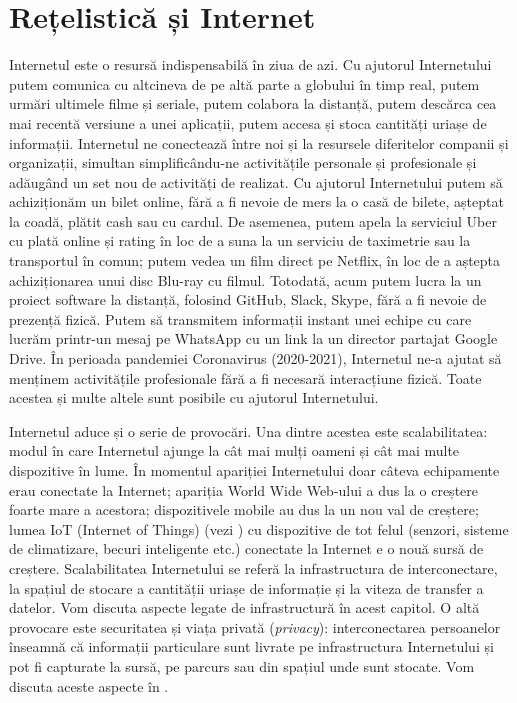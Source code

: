 \chapter{Rețelistică și Internet}
\label{ch:net}

Internetul este o resursă indispensabilă în ziua de azi.
Cu ajutorul Internetului putem comunica cu altcineva de pe altă parte a globului în timp real, putem urmări ultimele filme și seriale, putem colabora la distanță, putem descărca cea mai recentă versiune a unei aplicații, putem accesa și stoca cantități uriașe de informații.
Internetul ne conectează între noi și la resursele diferitelor companii și organizații, simultan simplificându-ne activitățile personale și profesionale și adăugând un set nou de activități de realizat.
Cu ajutorul Internetului putem să achiziționăm un bilet online, fără a fi nevoie de mers la o casă de bilete, așteptat la coadă, plătit cash sau cu cardul.
De asemenea, putem apela la serviciul Uber cu plată online și rating în loc de a suna la un serviciu de taximetrie sau la transportul în comun;
putem vedea un film direct pe Netflix, în loc de a aștepta achiziționarea unui disc Blu-ray cu filmul.
Totodată, acum putem lucra la un proiect software la distanță, folosind GitHub, Slack, Skype, fără a fi nevoie de prezență fizică.
Putem să transmitem informații instant unei echipe cu care lucrăm printr-un mesaj pe WhatsApp cu un link la un director partajat Google Drive.
În perioada pandemiei Coronavirus (2020-2021), Internetul ne-a ajutat să menținem activitățile profesionale fără a fi necesară interacțiune fizică.
Toate acestea și multe altele sunt posibile cu ajutorul Internetului.

Internetul aduce și o serie de provocări.
Una dintre acestea este scalabilitatea: modul în care Internetul ajunge la cât mai mulți oameni și cât mai multe dispozitive în lume.
În momentul apariției Internetului doar câteva echipamente erau conectate la Internet;
apariția World Wide Web-ului a dus la o creștere foarte mare a acestora;
dispozitivele mobile au dus la un nou val de creștere;
lumea IoT (Internet of Things) (vezi ) cu dispozitive de tot felul (senzori, sisteme de climatizare, becuri inteligente etc.) conectate la Internet e o nouă sursă de creștere.
Scalabilitatea Internetului se referă la infrastructura de interconectare, la spațiul de stocare a cantității uriașe de informație și la viteza de transfer a datelor. Vom discuta aspecte legate de infrastructură în acest capitol.
O altă provocare este securitatea și viața privată (\textit{privacy}): interconectarea persoanelor înseamnă că informații particulare sunt livrate pe infrastructura Internetului și pot fi capturate la sursă, pe parcurs sau din spațiul unde sunt stocate. Vom discuta aceste aspecte în .

